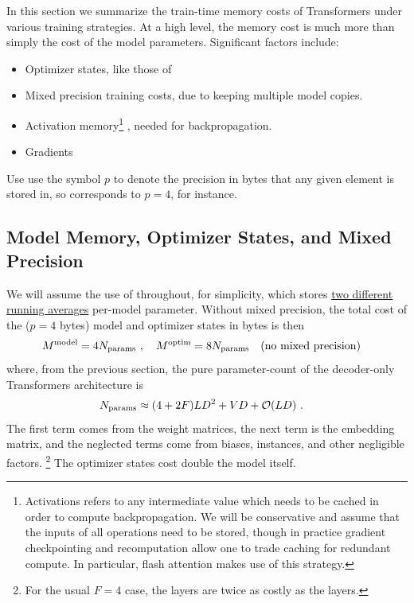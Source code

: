 \documentclass[11pt]{article}
\begin{document}
In this section we summarize the train-time memory costs of Transformers under various training
strategies.  At a high level, the memory cost is much more than simply the cost of the model
parameters. Significant factors include:
\begin{itemize}
\item Optimizer states, like those of 
\item Mixed precision training costs, due to keeping multiple model copies.
\item Activation memory\footnote{Activations refers to any intermediate value which needs to be
    cached in order to compute backpropagation. We will be conservative and assume that the inputs
of all operations need to be stored, though in practice gradient checkpointing and recomputation
allow one to trade caching for redundant compute. In particular, flash attention
\cite{dao2022flashattention} makes use of this strategy.} , needed for backpropagation.
\item Gradients
\end{itemize}

Use use the symbol $ p $ to denote the precision in bytes that any given element is stored in, so
 corresponds to $ p=4 $, for instance.


\subsection{Model Memory, Optimizer States, and Mixed Precision}

We will assume the use of  throughout, for
simplicity, which stores \href{https://pytorch.org/docs/stable/generated/torch.optim.Adam.html}{two
different running averages} per-model parameter. Without mixed precision, the total cost of the
 ($ p=4 $ bytes) model and optimizer states in bytes is then
\begin{align}
    M ^{ \rm model} &= 4 N _{ \rm params } \ , \quad M^{ \rm  optim } = 8 N _{ \rm params }
    \quad ({\rm no \ mixed \ precision})
    \label{eq_optimizer_states_no_mp}
\end{align}
where, from the previous section, the pure parameter-count of the decoder-only Transformers
architecture is
\begin{align}
    N _{ \rm params } &\approx  (4 + 2F) L D ^{ 2 } + VD +  \mathcal{O}( LD)\ .
\end{align}
The first term comes from the  weight matrices, the next term is
the embedding matrix, and the neglected terms come from biases,  instances, and
other negligible factors. \footnote{For the usual $ F=4 $ case, the  layers are twice as costly
as the  layers.} The optimizer states cost double the model itself.
\end{document}
